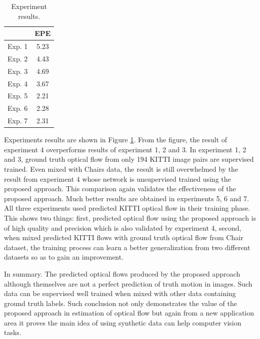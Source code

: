 \documentclass{iitthesis}
\begin{document}
\begin{table}[thbp]
\centering
\caption{Experiment results.}
\label{tab: optical flow experiments train using predicted flows}
\begin{tabular}{cc}
\hline
\hline
       & EPE  \\ \hline
Exp. 1 & 5.23 \\ 
Exp. 2 & 4.43 \\ 
Exp. 3 & 4.69 \\ 
Exp. 4 & 3.67 \\ 
Exp. 5 & 2.21 \\ 
Exp. 6 & 2.28 \\ 
Exp. 7 & 2.31 \\ \hline
\end{tabular}
\end{table}

Experiments results are shown in Figure \ref{tab: optical flow experiments train using predicted flows}. From the figure, the result of experiment 4 overperforms results of experiment 1, 2 and 3. In experiment 1, 2 and 3, ground truth optical flow from only 194 KITTI image pairs are supervised trained. Even mixed with Chairs data, the result is still overwhelmed by the result from experiment 4 whose network is unsupervised trained using the proposed approach. This comparison again validates the effectiveness of the proposed approach. Much better results are obtained in experiments 5, 6 and 7. All three experiments used predicted KITTI optical flow in their training phase. This shows two things: first, predicted optical flow using the proposed approach is of high quality and precision which is also validated by experiment 4, second, when mixed predicted KITTI flows with ground truth optical flow from Chair dataset, the training process can learn a better generalization from two different datasets so as to gain an improvement. 

In summary. The predicted optical flows produced by the proposed approach although themselves are not a perfect prediction of truth motion in images. Such data can be supervised well trained when mixed with other data containing ground truth labels. Such conclusion not only demonstrates the value of the proposed approach in estimation of optical flow but again from a new application area it proves the main idea of using synthetic data can help computer vision tasks.  

\clearpage

 \label{chapter: learning from synthetic data}
\end{document}
